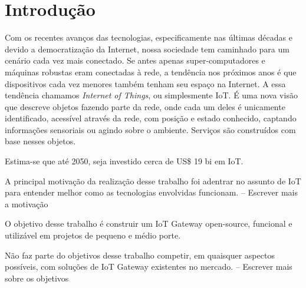 \section*{Introdução}
\label{sec:intro}

Com os recentes avanços das tecnologias, especificamente nas últimas décadas e devido a democratização da Internet, nossa sociedade tem caminhado para um cenário cada vez mais conectado. Se antes apenas super-computadores e máquinas robustas eram conectadas à rede, a tendência nos próximos anos é que dispositivos cada vez menores também tenham seu espaço na Internet.
A essa tendência chamamos \textit{Internet of Things}, ou simplesmente IoT. É uma nova visão que descreve objetos fazendo parte da rede, onde cada um deles é unicamente identificado, acessível através da rede, com posição e estado conhecido, captando informações sensoriais ou agindo sobre o ambiente. Serviços são construídos com base nesses objetos.

Estima-se que até 2050, seja investido cerca de US\$ 19 bi em IoT.

A principal motivação da realização desse trabalho foi adentrar no assunto de IoT para entender melhor como as tecnologias envolvidas funcionam.
-- Escrever mais a motivação

O objetivo desse trabalho é construir um IoT Gateway open-source, funcional e utilizável em projetos de pequeno e médio porte.

Não faz parte do objetivos desse trabalho competir, em quaisquer aspectos possíveis, com soluções de IoT Gateway existentes no mercado.
-- Escrever mais sobre os objetivos

